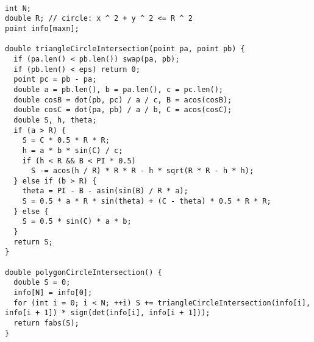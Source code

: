 \begin{lstlisting}

int N;
double R; // circle: x ^ 2 + y ^ 2 <= R ^ 2
point info[maxn];

double triangleCircleIntersection(point pa, point pb) {
  if (pa.len() < pb.len()) swap(pa, pb);
  if (pb.len() < eps) return 0;
  point pc = pb - pa;
  double a = pb.len(), b = pa.len(), c = pc.len();
  double cosB = dot(pb, pc) / a / c, B = acos(cosB);
  double cosC = dot(pa, pb) / a / b, C = acos(cosC);
  double S, h, theta;
  if (a > R) {
    S = C * 0.5 * R * R;
    h = a * b * sin(C) / c;
    if (h < R && B < PI * 0.5)
      S -= acos(h / R) * R * R - h * sqrt(R * R - h * h);
  } else if (b > R) {
    theta = PI - B - asin(sin(B) / R * a);
    S = 0.5 * a * R * sin(theta) + (C - theta) * 0.5 * R * R;
  } else {
    S = 0.5 * sin(C) * a * b;
  }
  return S;
}

double polygonCircleIntersection() {
  double S = 0;
  info[N] = info[0];
  for (int i = 0; i < N; ++i) S += triangleCircleIntersection(info[i], info[i + 1]) * sign(det(info[i], info[i + 1]));
  return fabs(S);
}

\end{lstlisting}